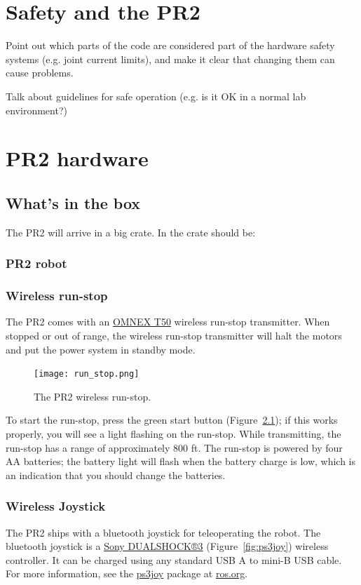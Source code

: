 \chapter{Safety and the PR2}
Point out which parts of the code are considered part of the hardware safety systems (e.g. joint current limits), 
and make it clear that changing them can cause problems.

Talk about guidelines for safe operation (e.g. is it OK in a normal lab environment?)

\chapter{PR2 hardware}

\section{What's in the box}
The PR2 will arrive in a big crate.  In the crate should be:
\subsection{PR2 robot}
\subsection{Wireless run-stop}
\label{wirelessrunstop}
The PR2 comes with an \href{http://www.omnexcontrols.com/products/portable/t50.html}{OMNEX T50} 
wireless run-stop transmitter. When stopped or out of range, the wireless run-stop transmitter will halt the motors 
and put the power system in standby mode. 

\begin{figure}[h]
\centering
\texttt{[image: run\_stop.png]}
\caption{The PR2 wireless run-stop.}
\label{fig:runstop}
\end{figure}

To start the run-stop, press the green start button (Figure~\ref{fig:runstop}); if this works properly, you will see a 
light flashing on the run-stop. While transmitting, the run-stop has a range of approximately 800 ft. The run-stop is 
powered by four AA batteries; the battery light will flash when the battery charge is low, which is an indication that 
you should change the batteries.

\subsection{Wireless Joystick}
The PR2 ships with a bluetooth joystick for teleoperating the robot. The bluetooth joystick is a 
\href{http://www.sonystyle.com/webapp/wcs/stores/servlet/ProductDisplay?catalogId=10551&storeId=10151&langId=-1&productId=8198552921665411965#additionalImage1%22}{Sony DUALSHOCK®3} (Figure~\ref{fig:ps3joy}) 
wireless controller. It can be charged using any standard USB A to mini-B USB cable. For more information, see the 
\href{http://www.ros.org/wiki/ps3joy}{ps3joy} package at \href{http://www.ros.org}{ros.org}.

